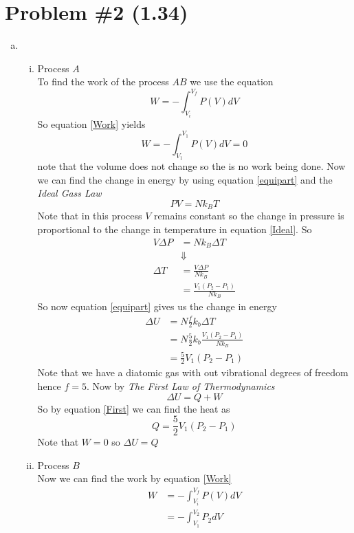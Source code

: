 \documentclass[11pt]{article}
\numberwithin{equation}{section}
\begin{document}
\section{Problem \#2 (1.34)}
\begin{enumerate}[(a)]
\item
\begin{enumerate}[(i)]
\item Process $A$\\
To find the work of the process $AB$ we use the equation
\begin{equation}
W = -\int_{V_i}^{V_f}P(V)dV
\label{Work}
\end{equation}
So equation \ref{Work} yields
$$W =-\int_{V_1}^{V_1}P(V)dV = 0$$
note that the volume does not change so the is no work being done. Now we can find the change in energy by using equation \ref{equipart} and the \emph{Ideal Gass Law}
\begin{equation}
PV = Nk_BT
\label{Ideal}
\end{equation}
Note that in this process $V$ remains constant so the change in pressure is proportional to the change in temperature in equation \ref{Ideal}. So
\begin{align*}
V\Delta P &= Nk_B \Delta T\\
&\Downarrow\\
\Delta T &= \frac{V\Delta P}{Nk_B}\\
&= \frac{V_1(P_2-P_1)}{Nk_B}
\end{align*}
So now equation \ref{equipart} gives us the change in energy
\begin{align*}
\Delta U &= N\frac{f}{2}k_b\Delta T\\
&= N\frac{5}{2}k_b\frac{V_1(P_2-P_1)}{Nk_B}\\
&= \frac{5}{2}V_1(P_2-P_1)
\end{align*}
Note that we have a diatomic gas with out vibrational degrees of freedom hence $f=5$. Now by \emph{The First Law of Thermodynamics} 
\begin{equation}
\Delta U = Q + W
\label{First}
\end{equation}
So by equation \ref{First} we can find the heat as
$$Q = \frac{5}{2}V_1(P_2-P_1)$$
Note that $W=0$ so $\Delta U=Q$
\item Process $B$ \\
Now we can find the work by equation \ref{Work}
\begin{align*}
W &= -\int_{V_i}^{V_f}P(V)dV\\
&= -\int_{V_1}^{V_2}P_2dV\\

\end{align*}
\end{enumerate}
\end{enumerate}
\end{document}

